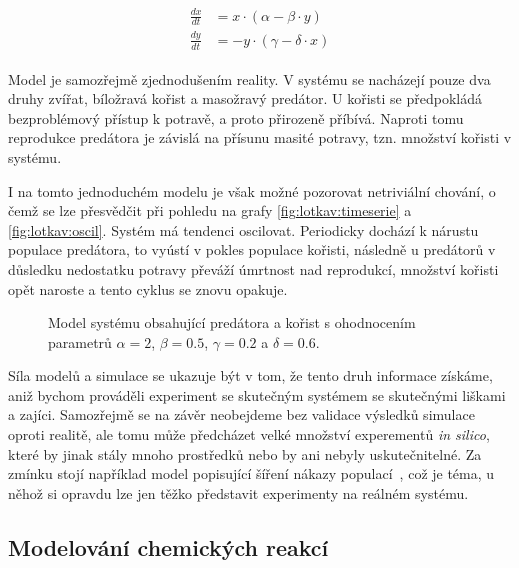 \begin{align}\label{eq:lotkav}
\begin{array}{ll}
\frac{dx}{dt} &= x\cdot(\alpha - \beta \cdot y)			\\
\frac{dy}{dt} &= -y \cdot (\gamma - \delta \cdot x)
\end{array}
\end{align}

Model je samozřejmě zjednodušením reality. V systému se nacházejí pouze dva druhy
zvířat, bíložravá kořist a masožravý predátor. U kořisti se předpokládá bezproblémový
přístup k potravě, a proto přirozeně příbívá. Naproti tomu reprodukce predátora je
závislá na přísunu masité potravy, tzn. množství kořisti v systému.

I na tomto jednoduchém modelu je však možné pozorovat netriviální chování, o čemž se lze přesvědčit
při pohledu na grafy  \ref{fig:lotkav:timeserie} a \ref{fig:lotkav:oscil}. Systém má
tendenci oscilovat. Periodicky dochází k nárustu populace predátora, to vyústí v pokles
populace kořisti, následně u predátorů v důsledku nedostatku potravy převáží úmrtnost nad reprodukcí,
množství kořisti opět naroste a tento cyklus se znovu opakuje.

\begin{figure}[h!]
\begin{center}
\end{center}
\caption{Model systému obsahující predátora a kořist s ohodnocením parametrů $\alpha = 2$,  $\beta = 0.5$, $\gamma = 0.2$ a $\delta = 0.6$.}
\end{figure}

Síla modelů a simulace se ukazuje být v tom, že tento druh informace získáme, aniž bychom prováděli
experiment se skutečným systémem se  skutečnými liš\-ka\-mi a zajíci. Samozřejmě se na závěr neobejdeme
bez validace výsledků simulace oproti realitě, ale tomu může předcházet velké množství
experementů \textit{in silico}, které by jinak stály mnoho prostředků nebo by ani 
nebyly uskutečnitelné. Za zmínku stojí například model popisující šíření nákazy
populací~\cite{kermack1927}, což je téma, u něhož si opravdu lze jen těžko představit
experimenty na reálném systému.

\subsection{Modelování chemických reakcí}

